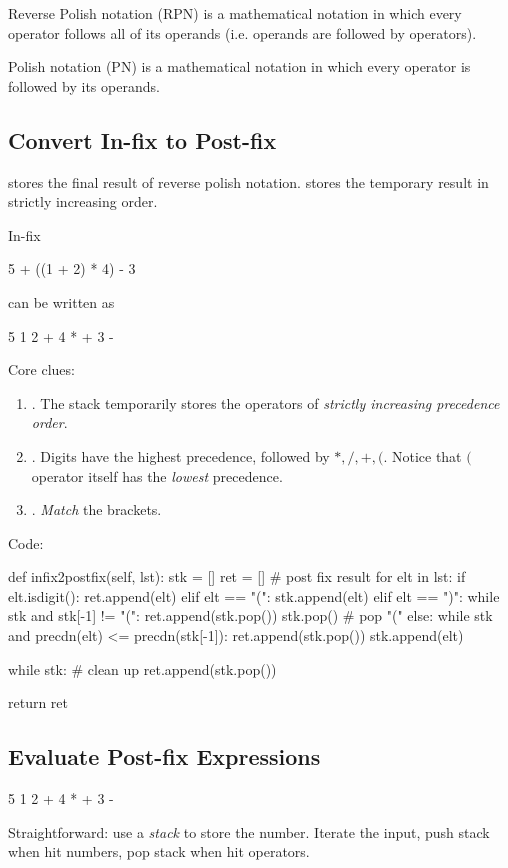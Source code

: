 Reverse Polish notation (RPN) is a mathematical notation in which every operator follows all of its operands (i.e. operands are followed by operators).

Polish notation (PN) is a mathematical notation in which every operator is followed by its operands. 

\subsection{Convert In-fix to Post-fix}
 stores the final result of reverse polish notation.  stores
the temporary result in strictly increasing order. 

In-fix
\begin{python}
5 + ((1 + 2) * 4) - 3
\end{python}

can be written as
\begin{python}
5 1 2 + 4 * + 3 - 
\end{python}
Core clues:
\begin{enumerate}
\item {}. The stack temporarily stores the operators of \textit{strictly increasing precedence order}.
\item {}. Digits have the highest precedence, followed by $*, /, +, ($. Notice that $($ operator itself has the \textit{lowest} precedence.
\item {}. \textit{Match} the brackets. 
\end{enumerate}
Code:
\begin{python}
def infix2postfix(self, lst):
  stk = []
  ret = []  # post fix result
  for elt in lst:
    if elt.isdigit():
      ret.append(elt)
    elif elt == "(":
      stk.append(elt)
    elif elt == ")":
      while stk and stk[-1] != "(":
        ret.append(stk.pop())
      stk.pop()  # pop "("
    else:
      while stk and precdn(elt) <= precdn(stk[-1]):
        ret.append(stk.pop())
      stk.append(elt)

  while stk:  # clean up 
    ret.append(stk.pop())

  return ret
\end{python}

\subsection{Evaluate Post-fix Expressions}
\begin{python}
5 1 2 + 4 * + 3 - 
\end{python}
Straightforward: use a \textit{stack} to store the number. Iterate the input, push
stack when hit numbers, pop stack when hit operators.

